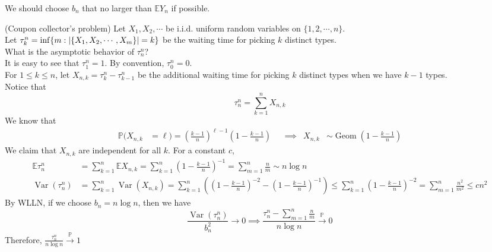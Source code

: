 \documentclass{huhtakm-template-book}
\newcommand{\prob}{\mathbb{P}}
\newcommand{\expect}{\mathbb{E}}
\DeclareMathOperator{\Geom}{Geom}
\DeclareMathOperator{\Var}{Var}
\begin{document}
\begin{rem}
	We should choose $b_{n}$ that no larger than $\expect Y_{n}$ if possible.
\end{rem}
\begin{eg}(Coupon collector's problem) 
	Let $X_{1},X_{2},\cdots$ be i.i.d. uniform random variables on $\{1,2,\cdots,n\}$.\\
	Let $\tau_{k}^{n}=\inf\{m:\left|{\{X_{1},X_{2},\cdots,X_{m}\}}\right|=k\}$ be the waiting time for picking $k$ distinct types.\\
	What is the asymptotic behavior of $\tau_{n}^{n}$?\\
	It is easy to see that $\tau_{1}^{n}=1$. By convention, $\tau_{0}^{n}=0$.\\
	For $1\leq k\leq n$, let $X_{n,k}=\tau_{k}^{n}-\tau_{k-1}^{n}$ be the additional waiting time for picking $k$ distinct types when we have $k-1$ types.\\
	Notice that
	\begin{equation*}
		\tau_{n}^{n}=\sum_{k=1}^{n}X_{n,k}
	\end{equation*}
	We know that
	\begin{align*}
		\prob(X_{n,k}&=\ell)=\left(\frac{k-1}{n}\right)^{\ell-1}\left(1-\frac{k-1}{n}\right) & &\implies & X_{n,k}&\sim\Geom\left(1-\frac{k-1}{n}\right)
	\end{align*}
	We claim that $X_{n,k}$ are independent for all $k$. For a constant $c$,
	\begin{align*}
		\expect\tau_{n}^{n}&=\sum_{k=1}^{n}\expect X_{n,k}=\sum_{k=1}^{n}\left(1-\frac{k-1}{n}\right)^{-1}=\sum_{m=1}^{n}\frac{n}{m}\sim n\log n\\
		\Var(\tau_{n}^{n})&=\sum_{k=1}^{n}\Var(X_{n,k})=\sum_{k=1}^{n}\left(\left(1-\frac{k-1}{n}\right)^{-2}-\left(1-\frac{k-1}{n}\right)^{-1}\right)\leq\sum_{k=1}^{n}\left(1-\frac{k-1}{n}\right)^{-2}=\sum_{m=1}^{n}\frac{n^{2}}{m^{2}}\leq cn^{2}
	\end{align*}
	By WLLN, if we choose $b_{n}=n\log n$, then we have
	\begin{equation*}
		\frac{\Var(\tau_{n}^{n})}{b_{n}^{2}}\to 0\implies\frac{\tau_{n}^{n}-\sum_{m=1}^{n}\frac{n}{m}}{n\log n}\xrightarrow{\prob}0
	\end{equation*}
	Therefore, $\frac{\tau_{n}^{n}}{n\log n}\xrightarrow{\prob}1$
\end{eg}
\end{document}
